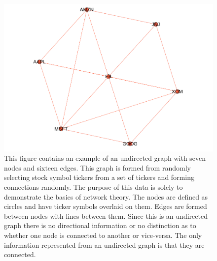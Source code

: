\begin{figure}[!htb]
    \centering
      \centering
      \includegraphics[width=\textwidth]{figures/Intro/ExampleNetwork.pdf}

      \caption{
      This figure contains an example of an undirected graph with seven nodes and sixteen edges. This graph is formed from randomly selecting stock symbol tickers from a set of tickers and forming connections randomly. The purpose of this data is solely to demonstrate the basics of network theory. The nodes are defined as circles and have ticker symbols overlaid on them. Edges are formed between nodes with lines between them.  Since this is an undirected graph there is no directional information or no distinction as to whether one node is connected to another or vice-versa.  The only information represented from an undirected graph is that they are connected.  
      }
      \label{fig:IntroExampleNetwork}

  \end{figure}



